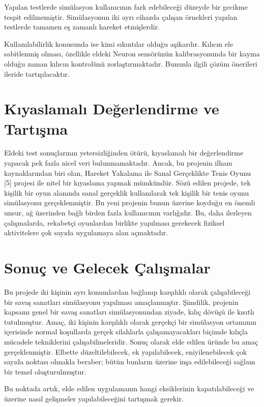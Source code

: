 \documentclass[a4paper, 12pt, titlepage]{article}
\begin{document}
Yapılan testlerde simülasyon kullanıcının fark edebileceği düzeyde bir gecikme tespit edilmemiştir.
Simülasyonun iki ayrı cihazda çalışan örnekleri yapılan testlerde tamamen eş zamanlı hareket
etmişlerdir.

Kullanılabilirlik konusunda ise kimi sıkıntılar olduğu aşikardır. Kılıcın ele sabitlenmiş olması,
özellikle eldeki Neuron sensörünün kalibrasyonunda bir kayma olduğu zaman kılıcın kontrolünü
zorlaştırmaktadır. Bununla ilgili çözüm önerileri ileride tartışılacaktır.

\newpage
\section{Kıyaslamalı Değerlendirme ve Tartışma}
Eldeki test sonuçlarının yetersizliğinden ötürü, kıyaslamalı bir değerlendirme yapacak pek fazla
nicel veri bulunmamaktadır. Ancak, bu projenin ilham kaynaklarından biri olan, Hareket Yakalama ile
Sanal Gerçeklikte Tenis Oyunu [5] projesi ile nitel bir kıyaslama yapmak mümkündür. Sözü edilen
projede, tek kişilik bir oyun alanında sanal gerçeklik kullanılarak tek kişilik bir tenis oyunu
simülasyonu gerçeklenmiştir. Bu yeni projenin bunun üzerine koyduğu en önemli unsur, ağ üzerinden
bağlı birden fazla kullanıcının varlığıdır. Bu, daha ilerleyen çalışmalarda, rekabetçi oyunlardan
birlikte yapılması gerekecek fiziksel aktivitelere çok sayıda uygulamaya alan açmaktadır.

\newpage
\section{Sonuç ve Gelecek Çalışmalar}
Bu projede iki kişinin ayrı konumlardan bağlanıp karşılıklı olarak çalışabileceği bir savaş
sanatları simülasyonu yapılması amaçlanmıştır. Şimdilik, projenin kapsamı genel bir savaş sanatları
simülasyonundan ziyade, kılıç dövüşü ile kısıtlı tutulmuştur. Amaç, iki kişinin karşılıklı olarak
gerçekçi bir simülasyon ortamının içerisinde normal koşullarda gerçek silahlarla çalışamayacakları
biçimde kılıçla mücadele tekniklerini çalışabilmeleridir. Sonuç olarak elde edilen üründe bu amaç
gerçeklenmiştir. Elbette düzeltilebilecek, ek yapılabilecek, eniyilenebilecek çok sayıda noktası
olmakla beraber; bütün bunların üzerine inşa edilebileceği sağlam bir temel oluşturulmuştur.

Bu noktada artık, elde edilen uygulamanın hangi eksiklerinin kapatılabileceği ve üzerine nasıl
gelişmeler yapılabileceğini tartışmak gerekir.
\end{document}
